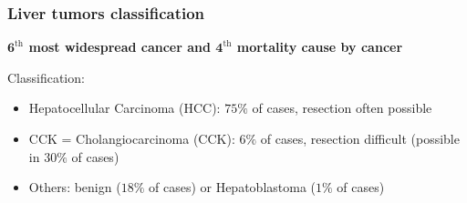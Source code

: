 \documentclass{beamer}
\begin{document}



    






\begin{frame}
    \frametitle{Liver tumors classification}
    \begin{center}
        \textbf{$\mathbf{6}^{\text{th}}$ most widespread cancer and $\mathbf{4}^{\text{th}}$ mortality cause by cancer}\\
    \end{center}
    Classification:
    \begin{itemize}
        \item Hepatocellular Carcinoma (HCC): $75\%$ of cases, resection often possible\\[10 pt]
        \item CCK = Cholangiocarcinoma (CCK): $6\%$ of cases, resection difficult (possible in $30\%$ of cases)\\[10 pt]
        \item Others: benign ($18 \%$ of cases) or Hepatoblastoma ($1 \%$ of cases)
    \end{itemize}
\end{frame}
\end{document}
